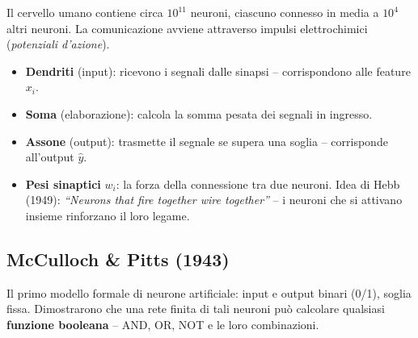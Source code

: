Il cervello umano contiene circa $10^{11}$ neuroni, ciascuno connesso in media a $10^4$ altri neuroni. La comunicazione avviene attraverso impulsi elettrochimici (\emph{potenziali d'azione}).

\begin{center}
\end{center}

\begin{itemize}
    \item \textbf{Dendriti} (input): ricevono i segnali dalle sinapsi -- corrispondono alle feature $x_i$.
    \item \textbf{Soma} (elaborazione): calcola la somma pesata dei segnali in ingresso.
    \item \textbf{Assone} (output): trasmette il segnale se supera una soglia -- corrisponde all'output $\hat{y}$.
    \item \textbf{Pesi sinaptici} $w_i$: la forza della connessione tra due neuroni. Idea di Hebb (1949): \emph{``Neurons that fire together wire together''} -- i neuroni che si attivano insieme rinforzano il loro legame.
\end{itemize}

\subsection{McCulloch \& Pitts (1943)}

Il primo modello formale di neurone artificiale: input e output binari (0/1), soglia fissa. Dimostrarono che una rete finita di tali neuroni può calcolare qualsiasi \textbf{funzione booleana} -- AND, OR, NOT e le loro combinazioni.

